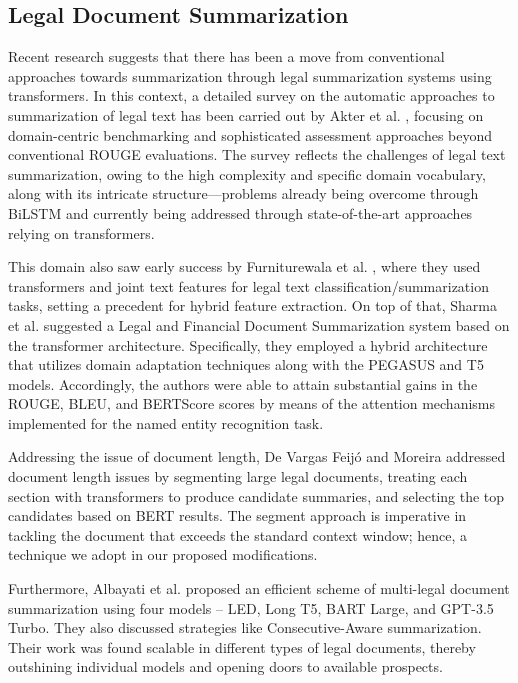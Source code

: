 \documentclass[conference]{IEEEtran}
\begin{document}
\subsection{Legal Document Summarization}
Recent research suggests that there has been a move from conventional approaches towards summarization through legal summarization systems using transformers. In this context, a detailed survey on the automatic approaches to summarization of legal text has been carried out by Akter et al. \cite{akter2025legal}, focusing on domain-centric benchmarking and sophisticated assessment approaches beyond conventional ROUGE evaluations. The survey reflects the challenges of legal text summarization, owing to the high complexity and specific domain vocabulary, along with its intricate structure—problems already being overcome through BiLSTM and currently being addressed through state-of-the-art approaches relying on transformers.

This domain also saw early success by Furniturewala et al. \cite{furniturewala2021legal}, where they used transformers and joint text features for legal text classification/summarization tasks, setting a precedent for hybrid feature extraction.
On top of that, Sharma et al. \cite{sharma2024legal} suggested a Legal and Financial Document Summarization system based on the transformer architecture. Specifically, they employed a hybrid architecture that utilizes domain adaptation techniques along with the PEGASUS and T5 models. Accordingly, the authors were able to attain substantial gains in the ROUGE, BLEU, and BERTScore scores by means of the attention mechanisms implemented for the named entity recognition task.

Addressing the issue of document length, De Vargas Feijó and Moreira \cite{vargas2023legal} addressed document length issues by segmenting large legal documents, treating each section with transformers to produce candidate summaries, and selecting the top candidates based on BERT results. The segment approach is imperative in tackling the document that exceeds the standard context window; hence, a technique we adopt in our proposed modifications.

Furthermore, Albayati et al. \cite{albayati2025multi} proposed an efficient scheme of multi-legal document summarization using four models – LED, Long T5, BART Large, and GPT-3.5 Turbo. They also discussed strategies like Consecutive-Aware summarization. Their work was found scalable in different types of legal documents, thereby outshining individual models and opening doors to available prospects.
\end{document}
